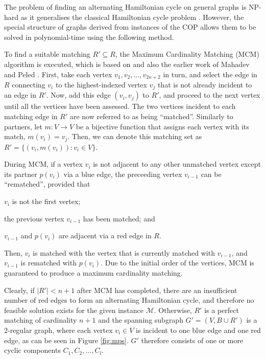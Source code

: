 \documentclass[runningheads]{llncs}
\begin{document}
The problem of finding an alternating Hamiltonian cycle on general graphs is NP-hard as it generalises the classical Hamiltonian cycle problem \cite{haggkvist1977}. However, the special structure of graphs derived from instances of the COP allows them to be solved in polynomial-time using the following method.

To find a suitable matching $R' \subseteq R$, the Maximum Cardinality Matching (MCM) algorithm is executed, which is based on \cite{becker2010} and also the earlier work of Mahadev and Peled \cite{mahadev1994}. First, take each vertex $v_1, v_2,..., v_{2n+2}$ in turn, and select the edge in $R$ connecting $v_i$ to the highest-indexed vertex $v_j$ that is not already incident to an edge in $R'$. Now, add this edge $(v_i, v_j)$ to $R'$, and proceed to the next vertex until all the vertices have been assessed. The two vertices incident to each matching edge in $R'$ are now referred to as being ``matched''. Similarly to partners, let $m : V \to V$ be a bijective function that assigns each vertex with its match, $m(v_i) = v_j$. Then, we can denote this matching set as $R' =\{(v_i, m(v_i)) : v_i \in V\}$. 

During MCM, if a vertex $v_i$ is not adjacent to any other unmatched vertex except its partner $p(v_i)$ via a blue edge, the preceeding vertex $v_{i-1}$ can be ``rematched'', provided that 
\begin{enumerate*}[label={(\alph*)}]
	\item $v_i$ is not the first vertex; 
	\item the previous vertex $v_{i-1}$ has been matched; and
	\item $v_{i-1}$ and $p(v_i)$ are adjacent via a red edge in $R$.
\end{enumerate*}
Then, $v_i$ is matched with the vertex that is currently matched with $v_{i-1}$, and $v_{i-1}$ is rematched with $p(v_i)$. Due to the initial order of the vertices, MCM is guaranteed to produce a maximum cardinality matching.

Clearly, if $|R'| < n+1$ after MCM has completed, there are an insufficient number of red edges to form an alternating Hamiltonian cycle, and therefore no feasible solution exists for the given instance $\mathcal{M}$. Otherwise, $R'$ is a perfect matching of cardinality $n+1$ and the spanning subgraph $G'=(V, B \cup R')$ is a 2-regular graph, where each vertex $v_i \in V$ is incident to one blue edge and one red edge, as can be seen in Figure \ref{fig:mps}. $G'$ therefore consists of one or more cyclic components $C_1, C_2, ..., C_l$. 
\end{document}

